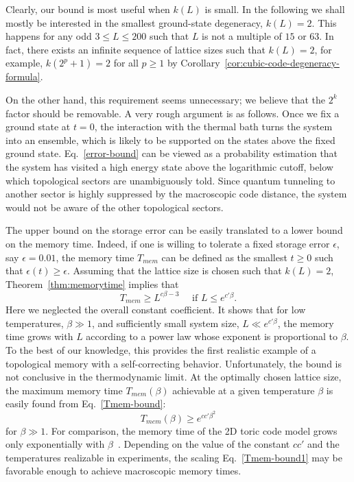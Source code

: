 Clearly, our bound is most useful when  $k(L)$ is small.
In the following we shall mostly be interested in the
smallest ground-state degeneracy, $k(L)=2$. 
This happens for any odd $3\le L\le 200$ such that $L$ is not a multiple of $15$ or $63$.
In fact, there exists an infinite sequence of lattice sizes
such that $k(L)=2$, for example, $k(2^p+1)=2$ for all $p\ge 1$
by Corollary~\ref{cor:cubic-code-degeneracy-formula}.


On the other hand, this requirement seems unnecessary; we believe that the $2^k$ factor should be removable.
A very rough argument is as follows.
Once we fix a ground state at $t=0$, the interaction with the thermal bath turns the system into an ensemble, 
which is likely to be supported on the states above the fixed ground state.
Eq.~\ref{error-bound} can be viewed as a probability estimation
that the system has visited a high energy state above the logarithmic cutoff,
below which topological sectors are unambiguously told.
Since quantum tunneling to another sector is highly suppressed by the macroscopic code distance,
the system would not be aware of the other topological sectors.


The upper bound on the storage error can be easily translated to a lower bound on the memory time.
Indeed, if one is willing to tolerate a fixed storage error $\epsilon$, say $\epsilon=0.01$,
the memory time $T_{mem}$ can be defined as the smallest $t \ge 0$ such that $\epsilon(t)\ge \epsilon$.
Assuming that the lattice size is chosen such that $k(L)=2$, Theorem~\ref{thm:memorytime} implies that
\begin{equation}
\label{Tmem-bound}
T_{mem} \ge L^{c\beta-3} \quad \text{ if } L \le e^{c'\beta}.
\end{equation}
Here we neglected the overall constant coefficient.
It shows that for low temperatures, $\beta \gg 1$,  and sufficiently small system size,
$L\ll e^{c' \beta}$,  the memory time grows with $L$ according to a power law
whose exponent is proportional to $\beta$.
To the best of our knowledge, this provides the first realistic example 
of a topological memory with a self-correcting behavior. 
Unfortunately, the bound is not conclusive in the thermodynamic limit.
At the optimally chosen lattice size,
the maximum memory time $T_{mem}(\beta)$ achievable at a given temperature $\beta$
is easily found from Eq.~\eqref{Tmem-bound}:
\begin{equation}
\label{Tmem-bound1}
T_{mem}(\beta) \ge e^{cc' \beta^2}
\end{equation}
for $\beta \gg 1$. For comparison, the memory time of the 2D toric code model grows
only exponentially with $\beta$~\cite{AlickiFannesHorodecki2009thermalization, ChesiRoethlisbergerLoss2010Self-Correcting}.
Depending on the value of the constant $cc'$ and the temperatures realizable in experiments,
the scaling Eq.~\eqref{Tmem-bound1} may be favorable enough to achieve macroscopic memory times.

